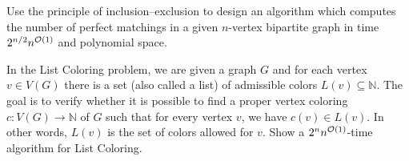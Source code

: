 \documentclass[english]{uebung_cs}
\begin{document}
\begin{exercise}
  Use the principle of inclusion--exclusion to design an algorithm which computes the number of perfect matchings in a given \(n\)-vertex bipartite graph in time \(2^{n/2} n^{\mathcal{O}(1)}\) and polynomial space.
\end{exercise}

\begin{exercise} %
  In the List Coloring problem, we are given a graph \( G \) and for each vertex \( v \in V(G) \) there is a set (also called a list) of admissible colors \( L(v) \subseteq \mathbb{N} \). The goal is to verify whether it is possible to find a proper vertex coloring \( c : V(G) \rightarrow \mathbb{N} \) of \( G \) such that for every vertex \( v \), we have \( c(v) \in L(v) \). In other words, \( L(v) \) is the set of colors allowed for \( v \).
  Show a \( 2^n n^{\mathcal{O}(1)} \)-time algorithm for List Coloring.
\end{exercise}
\end{document}
